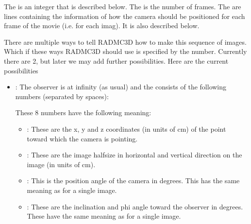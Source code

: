 \documentclass[letterpaper,10pt,english]{sphinxmanual}
\begin{document}
The  is an integer that is described below.  The  is the
number of frames. The  are lines
containing the information of how the camera should be positioned for each frame
of the movie (i.e. for each imag). It is also described below.

There are multiple ways to tell RADMC\sphinxhyphen{}3D how to make
this sequence of images. Which if these ways RADMC\sphinxhyphen{}3D should use is specified
by the  number. Currently there are 2, but later we may add
further possibilities. Here are the current possibilities
\begin{itemize}
\item {} 
:
The observer is at infinity (as usual) and the  consists of the following numbers (separated by
spaces):

\begin{sphinxVerbatim}[commandchars=\\\{\}]
       
\end{sphinxVerbatim}

These 8 numbers have the following meaning:
\begin{itemize}
\item {} 
:
These are the x, y and z coordinates (in units of cm) of the point toward
which the camera is pointing.

\item {} 
:
These are the image half\sphinxhyphen{}size in horizontal and vertical direction on the
image (in units of cm).

\item {} 
:
This is the position angle of the camera in degrees.
This has the same meaning as for a single image.

\item {} 
:
These are the inclination and phi angle toward the observer in degrees.
These have the same meaning as for a single image.


\end{itemize}
\end{itemize}
\end{document}
